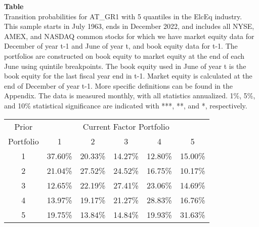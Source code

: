 \begin{table*}[ht!]
\raggedright
{}
\label{tab: transition_probs_AT_GR1_ElcEq_with_5_quantiles}
\textbf{Table \thetable} \\
Transition probabilities for AT_GR1 with 5 quantiles in the ElcEq industry. \\
\hspace*{1em}This sample starts in July 1963, ends in December 2022, and includes all NYSE, AMEX, and NASDAQ common stocks for which we have market equity data for December of year t-1 and June of year t, and book equity data for t-1. The portfolios are constructed on book equity to market equity at the end of each June using quintile breakpoints.  The book equity used in June of year t is the book equity for the last fiscal year end in t-1.  Market equity is calculated at the end of December of year t-1.  More specific definitions can be found in the Appendix.  The data is measured monthly, with all statistics annualized.  1\%, 5\%, and 10\% statistical significance are indicated with ***, **, and *, respectively. \\
\vspace{0.5em}
\centering
\begin{adjustbox}{max width=\textwidth}
\begin{tabular}{@{}cccccc@{}}
\toprule
Prior & \multicolumn{5}{c}{Current Factor Portfolio} \\
Portfolio & 1 & 2 & 3 & 4 & 5 \\
\midrule
1 & 37.60\% & 20.33\% & 14.27\% & 12.80\% & 15.00\% \\
2 & 21.04\% & 27.52\% & 24.52\% & 16.75\% & 10.17\% \\
3 & 12.65\% & 22.19\% & 27.41\% & 23.06\% & 14.69\% \\
4 & 13.97\% & 19.17\% & 21.27\% & 28.83\% & 16.76\% \\
5 & 19.75\% & 13.84\% & 14.84\% & 19.93\% & 31.63\% \\
\bottomrule
\end{tabular}
\end{adjustbox}
\end{table*}